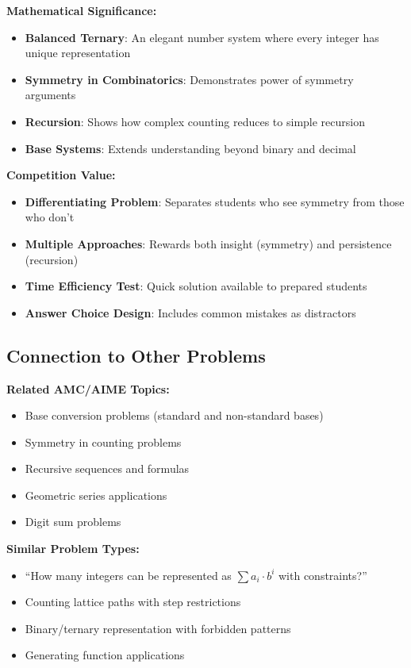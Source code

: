 \documentclass[12pt]{article}
\begin{document}
\textbf{Mathematical Significance:}
\begin{itemize}
    \item \textbf{Balanced Ternary}: An elegant number system where every integer has unique representation
    \item \textbf{Symmetry in Combinatorics}: Demonstrates power of symmetry arguments
    \item \textbf{Recursion}: Shows how complex counting reduces to simple recursion
    \item \textbf{Base Systems}: Extends understanding beyond binary and decimal
\end{itemize}

\textbf{Competition Value:}
\begin{itemize}
    \item \textbf{Differentiating Problem}: Separates students who see symmetry from those who don't
    \item \textbf{Multiple Approaches}: Rewards both insight (symmetry) and persistence (recursion)
    \item \textbf{Time Efficiency Test}: Quick solution available to prepared students
    \item \textbf{Answer Choice Design}: Includes common mistakes as distractors
\end{itemize}

\subsection*{Connection to Other Problems}

\textbf{Related AMC/AIME Topics:}
\begin{itemize}
    \item Base conversion problems (standard and non-standard bases)
    \item Symmetry in counting problems
    \item Recursive sequences and formulas
    \item Geometric series applications
    \item Digit sum problems
\end{itemize}

\textbf{Similar Problem Types:}
\begin{itemize}
    \item ``How many integers can be represented as $\sum a_i \cdot b^i$ with constraints?''
    \item Counting lattice paths with step restrictions
    \item Binary/ternary representation with forbidden patterns
    \item Generating function applications
\end{itemize}
\end{document}
